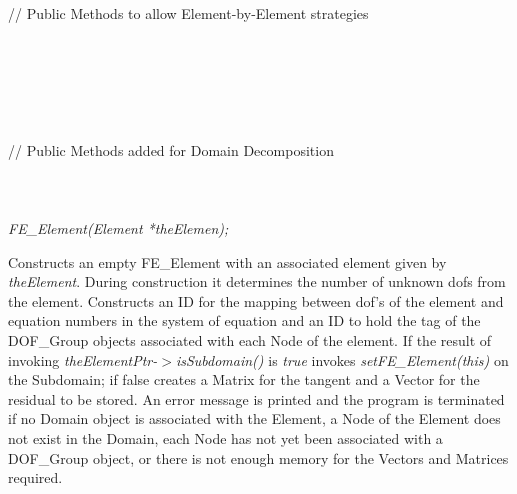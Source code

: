 \indent{}\\ 
\indent{}\\ 
\indent{}\\ 
\indent{}\\ 
\indent{}\\  \\
\indent\indent // Public Methods to allow Element-by-Element strategies \\
\indent{}\\
\indent{}\\ 
\indent{}\\ 
\indent{}\\
\indent{}\\ \\
\indent\indent // Public Methods added for Domain Decomposition \\
\indent{} \\
\indent{} \\

  \\
{\em FE\_Element(Element *theElemen);}  

Constructs an empty FE\_Element with an associated element given by {\em
theElement}.  During construction it determines the number of unknown
dofs from the element. Constructs an ID for the mapping between dof's of
the element and equation numbers in the system of equation and an ID
to hold the tag of the DOF\_Group objects associated with each Node of
the element. If the result of invoking {\em
theElementPtr-$>$isSubdomain()} is {\em true} invokes {\em
setFE\_Element(this)} on the Subdomain; if false creates a Matrix 
for the tangent and a Vector for the residual to be stored. An error
message is printed and the program is terminated if no Domain object
is associated with the Element, a Node of the Element does not exist
in the Domain, each Node has not yet been associated with a DOF\_Group
object, or there is not enough memory for the Vectors and Matrices
required. \\  

